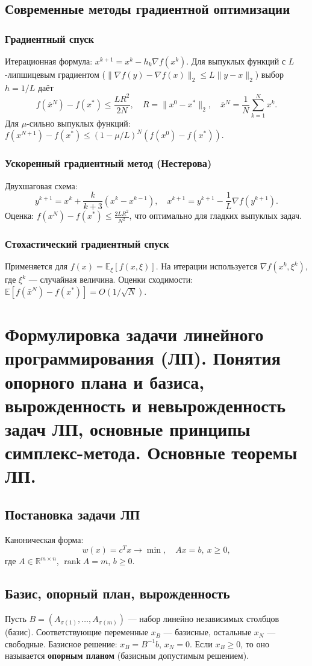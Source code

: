 \documentclass{article}
\theoremstyle{plain}
\begin{document}
\subsection{Современные методы градиентной оптимизации}
\subsubsection{Градиентный спуск}
Итерационная формула: $x^{k+1} = x^k - h_k \nabla f(x^k)$. Для выпуклых функций с $L$-липшицевым градиентом ($\|\nabla f(y)-\nabla f(x)\|_2 \le L\|y-x\|_2$) выбор $h = 1/L$ даёт
\[
f(\bar{x}^N) - f(x^*) \le \frac{L R^2}{2N},\quad R = \|x^0 - x^*\|_2,\quad \bar{x}^N = \frac{1}{N}\sum_{k=1}^N x^k.
\]
Для $\mu$-сильно выпуклых функций: $f(x^{N+1})-f(x^*) \le (1-\mu/L)^N (f(x^0)-f(x^*))$.

\subsubsection{Ускоренный градиентный метод (Нестерова)}
Двухшаговая схема:
\[
y^{k+1} = x^k + \frac{k}{k+3}(x^k - x^{k-1}),\quad x^{k+1} = y^{k+1} - \frac{1}{L}\nabla f(y^{k+1}).
\]
Оценка: $f(x^N) - f(x^*) \le \frac{2LR^2}{N^2}$, что оптимально для гладких выпуклых задач.

\subsubsection{Стохастический градиентный спуск}
Применяется для $f(x) = \mathbb{E}_{\xi}[f(x,\xi)]$. На итерации используется $\nabla f(x^k, \xi^k)$, где $\xi^k$ — случайная величина. Оценки сходимости: $\mathbb{E}[f(\bar{x}^N)-f(x^*)] = O(1/\sqrt{N})$.

\section{Формулировка задачи линейного программирования (ЛП). Понятия опорного плана и базиса, вырожденность и невырожденность задач ЛП, основные принципы симплекс-метода. Основные теоремы ЛП.}

\subsection{Постановка задачи ЛП}
Каноническая форма:
\[
w(x) = c^T x \to \min,\quad Ax = b,\ x \ge 0,
\]
где $A \in \mathbb{R}^{m \times n}$, $\operatorname{rank} A = m$, $b \ge 0$.

\subsection{Базис, опорный план, вырожденность}
Пусть $B = (A_{\sigma(1)},\dots,A_{\sigma(m)})$ — набор линейно независимых столбцов (базис). Соответствующие переменные $x_B$ — базисные, остальные $x_N$ — свободные. Базисное решение: $x_B = B^{-1}b$, $x_N = 0$. Если $x_B \ge 0$, то оно называется \textbf{опорным планом} (базисным допустимым решением).
\end{document}
